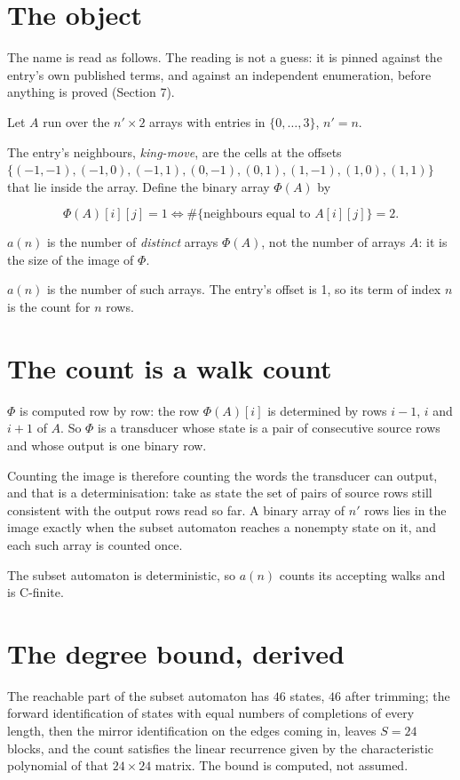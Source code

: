 \documentclass[11pt]{article}
\theoremstyle{definition}
\begin{document}
\section{The object}

The name is read as follows. The reading is not a guess: it is pinned against the entry's own published terms, and against an independent enumeration, before anything is proved (Section 7).

Let $A$ run over the $n' \times 2$ arrays with entries in $\{0,\dots,3\}$, $n' = n$.

The entry's neighbours, {\itshape king-move}, are the cells at the offsets $\{(-1,-1), (-1,0), (-1,1), (0,-1), (0,1), (1,-1), (1,0), (1,1)\}$ that lie inside the array. Define the binary array $\Phi(A)$ by

\[\Phi(A)[i][j] = 1 \iff \#\{\text{neighbours equal to } A[i][j]\} = 2.\]

$a(n)$ is the number of {\itshape distinct} arrays $\Phi(A)$, not the number of arrays $A$: it is the size of the image of $\Phi$.

$a(n)$ is the number of such arrays. The entry's offset is 1, so its term of index $n$ is the count for $n$ rows.

\section{The count is a walk count}

$\Phi$ is computed row by row: the row $\Phi(A)[i]$ is determined by rows $i-1$, $i$ and $i+1$ of $A$. So $\Phi$ is a transducer whose state is a pair of consecutive source rows and whose output is one binary row.

Counting the image is therefore counting the words the transducer can output, and that is a determinisation: take as state the set of pairs of source rows still consistent with the output rows read so far. A binary array of $n'$ rows lies in the image exactly when the subset automaton reaches a nonempty state on it, and each such array is counted once.

The subset automaton is deterministic, so $a(n)$ counts its accepting walks and is C-finite.

\section{The degree bound, derived}

The reachable part of the subset automaton has $46$ states, $46$ after trimming; the forward identification of states with equal numbers of completions of every length, then the mirror identification on the edges coming in, leaves $S = 24$ blocks, and the count satisfies the linear recurrence given by the characteristic polynomial of that $24\times24$ matrix. The bound is computed, not assumed.
\end{document}
